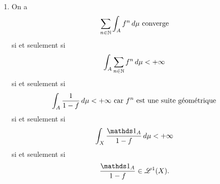 {\begin{nntd-sol}[]
\begin{enumerate}
\begin{itemize}
\begin{itemize}
                    \item Si \(\mu(C)>0\), alors on a
                    \begin{equation*}
                        \int_{C}f^n\der\mu = \int_{X}\one_C f^n\der\mu.
                    \end{equation*}
                    On pose alors \(g_n(x)=f^n(x)\one_C(x)\) une suite croissante de
                    fonctions mesurables car \(C\) est l'image réciproque par \(f\),
                    qui est mesurable. On peut alors appliquer le théorème de convergence
                    monotone pour obtenir
                    \begin{equation*}
                        \lim_{n\to+\infty}\int_{C}f^n\der\mu = \int_{C}\limsup_{n\to+\infty}f^n\der\mu
                    \end{equation*}
                    Comme le contenu de l'intégrale vaut \(+\infty\times\one_C\), on a l'intégrale qui vaut \(+\infty\).
                \end{itemize}
                En résumé, on a 
                \begin{equation*}
                    (1) + (2) =
                    \begin{cases}
                        \mu(B) & \text{si } \mu(C)=0 \\
                        +\infty & \text{si } \mu(C)>0
                    \end{cases}
                \end{equation*}
            \end{itemize}

            \item On a
            \begin{equation*}
                \sum_{n\in\mathbb{N}}\int_{A}f^n\mathop{}\!{d}\mu \text{ converge}
            \end{equation*}
            si et seulement si
            \begin{equation*}
                \int_{A}\sum_{n\in\mathbb{N}}f^n\mathop{}\!{d}\mu < +\infty
            \end{equation*}
            si et seulement si
            \begin{equation*}
                \int_{A}\frac{1}{1-f}\mathop{}\!{d}\mu < +\infty \text{ car } f^n \text{ est une suite géométrique}
            \end{equation*}
            si et seulement si
            \begin{equation*}
                \int_{X}\frac{\one_A}{1-f}\der\mu < +\infty
            \end{equation*}
            si et seulement si
            \begin{equation*}
                \frac{\one_A}{1-f}\in\scr L^1(X).
            \end{equation*}


\end{enumerate}
\end{nntd-sol}}
